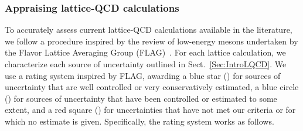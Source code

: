 \subsubsection{Appraising lattice-QCD calculations}
\label{subsubsec:BClQCD}

To accurately assess current lattice-QCD calculations
available in the literature, we follow a procedure inspired by the review of 
low-energy mesons undertaken by the Flavor Lattice Averaging Group 
(FLAG)~\cite{Aoki:2016frl}. 
%
For each lattice calculation, we characterize each source of 
uncertainty outlined in Sect.~\ref{Sec:IntroLQCD}. 
%
We use a rating system inspired by FLAG, awarding a blue star (\bstar) for 
sources of uncertainty that are well controlled or very conservatively 
estimated, a blue circle (\bcirc) for sources of uncertainty that have been 
controlled or estimated to some extent, and a red square (\rsquare) for 
uncertainties that have not met our criteria or for which no estimate is given.
%
Specifically, the rating system works as follows.

